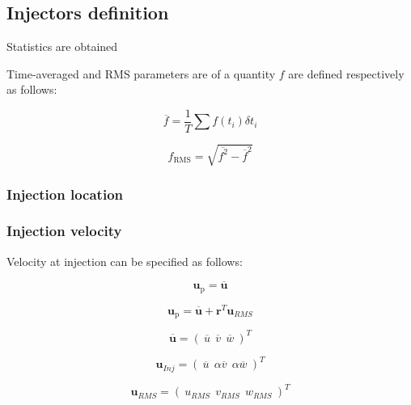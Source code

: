 \subsection{Injectors definition}

Statistics are obtained 

Time-averaged  and RMS parameters are of a quantity $f$ are defined respectively as follows:

\begin{equation}
\overline{f} = \frac{1}{T} \sum f \left( t_i \right) \delta t_i
\end{equation}

\begin{equation}
f_\mathrm{RMS} = \sqrt{\overline{f^2} - \overline{f}^2}
\end{equation}



\subsubsection*{Injection location}

\subsubsection*{Injection velocity}

Velocity at injection can be specified as follows:

\begin{equation}
\boldsymbol{u}_\mathrm{p} = \overline{\boldsymbol{u}} 
\end{equation}


\begin{equation}
\boldsymbol{u}_\mathrm{p} = \overline{\boldsymbol{u}} + \boldsymbol{r}^T \boldsymbol{u}_{RMS}
\end{equation}

\begin{equation}
 \overline{\boldsymbol{u}} = \left( ~ \overline{u} ~~ \overline{v} ~~ \overline{w} ~ \right)^T
\end{equation}

\begin{equation}
\boldsymbol{u}_{Inj} = \left( ~ \overline{u} ~~ \alpha \overline{v} ~~ \alpha \overline{w} ~ \right)^T
\end{equation}


\begin{equation}
\boldsymbol{u}_{RMS}= \left( ~ u_{RMS} ~~ v_{RMS} ~~ w_{RMS} ~ \right)^T
\end{equation}

